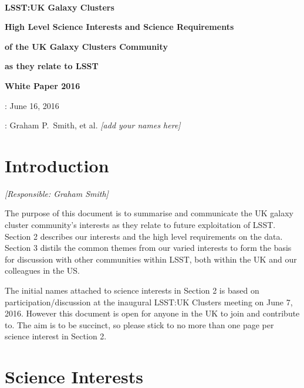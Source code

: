 \documentclass[a4paper,11pt]{article}
\begin{document}
\pagestyle{myheadings}

\sloppy

\pagestyle{empty}

~\vspace{70mm}

\centerline{\LARGE\bf LSST:UK Galaxy Clusters}
\bigskip\bigskip\bigskip
\centerline{\Large\bf High Level Science Interests and Science Requirements}
\medskip
\centerline{\Large\bf of the UK Galaxy Clusters Community}
\medskip
\centerline{\Large\bf as they relate to LSST}
\bigskip\bigskip\bigskip
\centerline{\Large\bf White Paper 2016}

\vspace{90mm}

\large
{}: June 16, 2016

: Graham P.\ Smith, et al. {\it [add your names here]}


\newpage
\pagestyle{myheadings}
\setlength{\topmargin}{-10mm}
\setlength{\textheight}{255mm}

\tableofcontents

\newpage

\section{Introduction}

{\it [Responsible: Graham Smith]}

\noindent 
The purpose of this document is to summarise and communicate the UK
galaxy cluster community's interests as they relate to future
exploitation of LSST.  Section 2 describes our interests and the high
level requirements on the data.  Section 3 distils the common themes
from our varied interests to form the basis for discussion with other
communities within LSST, both within the UK and our colleagues in the
US.

The initial names attached to science interests in Section 2 is based
on participation/discussion at the inaugural LSST:UK Clusters meeting
on June 7, 2016.  However this document is open for anyone in the UK
to join and contribute to.  The aim is to be succinct, so please stick
to no more than one page per science interest in Section 2.

\section{Science Interests}
\end{document}
